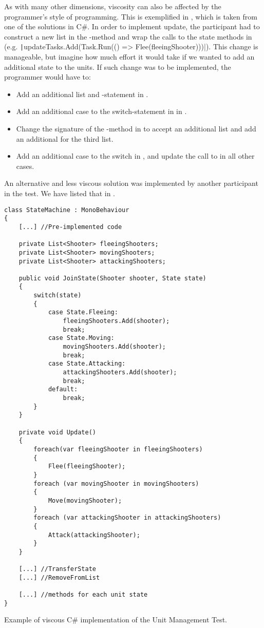 As with many other dimensions, viscosity can also be affected by the programmer's style of programming. This is exemplified in , which is taken from one of the solutions in C\#. In order to implement  update, the participant had to construct a new list in the -method and wrap the calls to the state methods in  (e.g. \texttt|updateTasks.Add(Task.Run(() => Flee(fleeingShooter)))|). This change is manageable, but imagine how much effort it would take if we wanted to add an additional state to the units. If such change was to be implemented, the programmer would have to:
\begin{itemize}
    \item Add an additional list and -statement in .
    \item Add an additional case to the switch-statement in  in .
    \item Change the signature of the -method in  to accept an additional list and add an additional  for the third list.
    \item Add an additional case to the switch in , and update the call to  in all other cases.
\end{itemize}
An alternative and less viscous solution was implemented by another participant in the test. We have listed that in .

\begin{listing}[H]
    \begin{verbatim}
class StateMachine : MonoBehaviour
{
    [...] //Pre-implemented code

    private List<Shooter> fleeingShooters;
    private List<Shooter> movingShooters;
    private List<Shooter> attackingShooters;

    public void JoinState(Shooter shooter, State state)
    {
        switch(state)
        {
            case State.Fleeing:
                fleeingShooters.Add(shooter);
                break;
            case State.Moving:
                movingShooters.Add(shooter);
                break;
            case State.Attacking:
                attackingShooters.Add(shooter);
                break;
            default:
                break;
        }
    }

    private void Update()
    {
        foreach(var fleeingShooter in fleeingShooters)
        {
            Flee(fleeingShooter);
        }
        foreach (var movingShooter in movingShooters)
        {
            Move(movingShooter);
        }
        foreach (var attackingShooter in attackingShooters)
        {
            Attack(attackingShooter);
        }
    }

    [...] //TransferState
    [...] //RemoveFromList

    [...] //methods for each unit state
}
    \end{verbatim}
    \caption{Example of viscous C\# implementation of the Unit Management Test.}
    \label{lst:csharp:viscous}
\end{listing}

